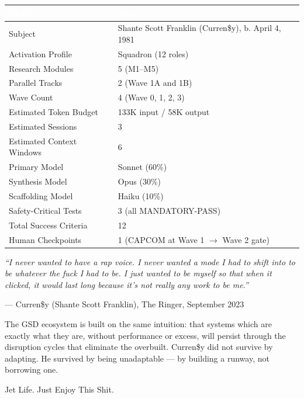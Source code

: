 \documentclass[11pt,letterpaper]{article}
\newcommand{\tableheader}[1]{\textbf{\sffamily\textcolor{white}{#1}}}
\begin{document}
\begin{center}
\begin{tabularx}{\textwidth}{L{5cm}X}
\toprule
{}
\tableheader{Metric} & \tableheader{Value} \\
\midrule
Subject & Shante Scott Franklin (Curren\$y), b. April 4, 1981 \\
Activation Profile & Squadron (12 roles) \\
Research Modules & 5 (M1–M5) \\
Parallel Tracks & 2 (Wave 1A and 1B) \\
Wave Count & 4 (Wave 0, 1, 2, 3) \\
Estimated Token Budget & 133K input / 58K output \\
Estimated Sessions & 3 \\
Estimated Context Windows & 6 \\
Primary Model & Sonnet (60\%) \\
Synthesis Model & Opus (30\%) \\
Scaffolding Model & Haiku (10\%) \\
Safety-Critical Tests & 3 (all MANDATORY-PASS) \\
Total Success Criteria & 12 \\
Human Checkpoints & 1 (CAPCOM at Wave 1 $\rightarrow$ Wave 2 gate) \\
\bottomrule
\end{tabularx}
\end{center}

\vspace{2em}

\begin{quotebox}
\textit{``I never wanted to have a rap voice. I never wanted a mode I had to shift into to be whatever the fuck I had to be. I just wanted to be myself so that when it clicked, it would last long because it's not really any work to be me.''}

\vspace{0.5em}
{\small\sffamily\textcolor{subtlegray}{--- Curren\$y (Shante Scott Franklin), The Ringer, September 2023}}

\vspace{1em}
The GSD ecosystem is built on the same intuition: that systems which are exactly what they are, without performance or excess, will persist through the disruption cycles that eliminate the overbuilt. Curren\$y did not survive by adapting. He survived by being unadaptable --- by building a runway, not borrowing one.

\vspace{0.5em}
{\small\sffamily\textcolor{subtlegray}{Jet Life. Just Enjoy This Shit.}}
\end{quotebox}
\end{document}
